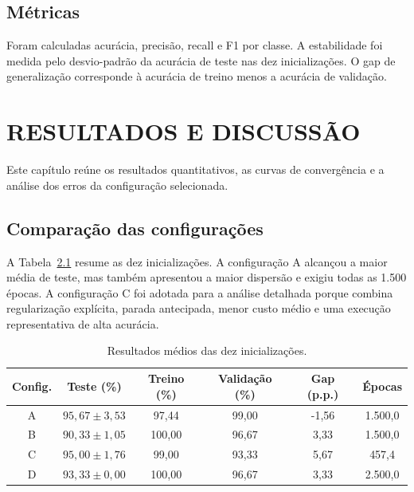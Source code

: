 \documentclass[12pt,a4paper,oneside,openany,chapter=TITLE,section=TITLE,subsection=TITLE,brazil]{abntex2}
\begin{document}
\section{Métricas}

Foram calculadas acurácia, precisão, recall e F1 por classe. A estabilidade foi medida pelo desvio-padrão da acurácia de teste nas dez inicializações. O gap de generalização corresponde à acurácia de treino menos a acurácia de validação.

\chapter{RESULTADOS E DISCUSSÃO}

Este capítulo reúne os resultados quantitativos, as curvas de convergência e a análise dos erros da configuração selecionada.

\section{Comparação das configurações}

A Tabela~\ref{tab:resultados} resume as dez inicializações. A configuração A alcançou a maior média de teste, mas também apresentou a maior dispersão e exigiu todas as 1.500 épocas. A configuração C foi adotada para a análise detalhada porque combina regularização explícita, parada antecipada, menor custo médio e uma execução representativa de alta acurácia.

\begin{table}[H]
\centering
\caption{Resultados médios das dez inicializações.}
\label{tab:resultados}
\small
\begin{tabular}{cccccc}
\toprule
\textbf{Config.} & \textbf{Teste (\%)} & \textbf{Treino (\%)} & \textbf{Validação (\%)} & \textbf{Gap (p.p.)} & \textbf{Épocas} \\
\midrule
A & $95{,}67 \pm 3{,}53$ & 97,44 & 99,00 & -1,56 & 1.500,0 \\
B & $90{,}33 \pm 1{,}05$ & 100,00 & 96,67 & 3,33 & 1.500,0 \\
C & $95{,}00 \pm 1{,}76$ & 99,00 & 93,33 & 5,67 & 457,4 \\
D & $93{,}33 \pm 0{,}00$ & 100,00 & 96,67 & 3,33 & 2.500,0 \\
\bottomrule
\end{tabular}
\end{table}
\end{document}
